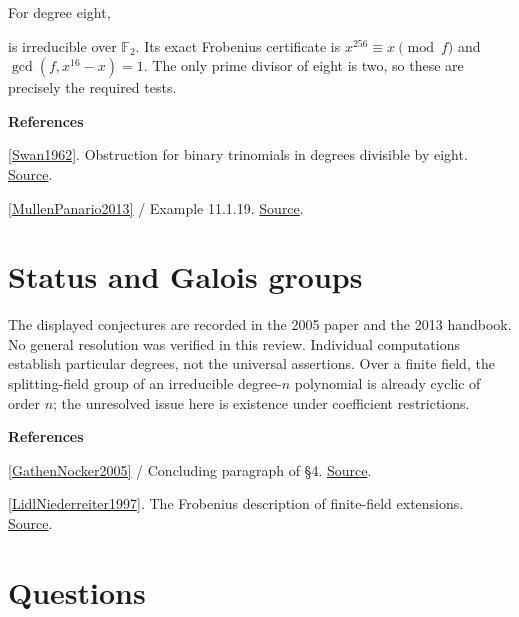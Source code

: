 \documentclass[11pt,a4paper,oneside,openany]{book}
\newcommand{\atlasdisplay}[1]{\par\begingroup\centering\vspace{3pt}\noindent\adjustbox{max width=\linewidth}{\(\displaystyle #1\)}\par\vspace{5pt}\endgroup}
\newenvironment{sources}{\par\smallskip\begingroup\footnotesize\color{atlasgray}\leftskip=10pt\setlength{\parskip}{2pt}}{\par\endgroup\smallskip}
\begin{document}
\begin{atlasblock}[standard]
\color{black} For degree eight,\par

\atlasdisplay{x^8+x^4+x^3+x+1}
\color{black} is irreducible over \(\mathbb F_2\). Its exact Frobenius certificate is \(x^{256}\equiv x\pmod f\) and \(\gcd(f,x^{16}-x)=1\). The only prime divisor of eight is two, so these are precisely the required tests.\par
\end{atlasblock}\color{black}
\begin{sources}
\textbf{References}\par\smallskip
\noindent\hyperlink{ref:Swan1962}{[Swan1962]}. Obstruction for binary trinomials in degrees divisible by eight. \href{https://msp.org/pjm/1962/12-3/pjm-v12-n3-p27-p.pdf}{Source}.\par
\noindent\hyperlink{ref:MullenPanario2013}{[MullenPanario2013]} / Example 11.1.19.  \href{https://doi.org/10.1201/b15006}{Source}.\par
\end{sources}\color{black}
\section{Status and Galois groups}
\color{black} The displayed conjectures are recorded in the 2005 paper and the 2013 handbook. No general resolution was verified in this review. Individual computations establish particular degrees, not the universal assertions. Over a finite field, the splitting-field group of an irreducible degree-\(n\) polynomial is already cyclic of order \(n\); the unresolved issue here is existence under coefficient restrictions.\par
\begin{sources}
\textbf{References}\par\smallskip
\noindent\hyperlink{ref:GathenNocker2005}{[GathenNocker2005]} / Concluding paragraph of §4.  \href{https://vonzurgathen.online/old/files/gatnoc05.pdf}{Source}.\par
\noindent\hyperlink{ref:LidlNiederreiter1997}{[LidlNiederreiter1997]}. The Frobenius description of finite-field extensions. \href{https://www.cambridge.org/core/books/finite-fields/75BDAA74ABAE713196E718392B9E5E72}{Source}.\par
\end{sources}\color{black}
\section*{Questions}
\end{document}
